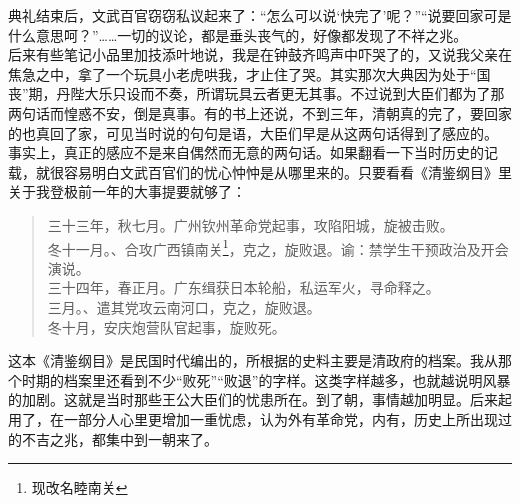 典礼结束后，文武百官窃窃私议起来了：“怎么可以说‘快完了’呢？”“说要回家可是什么意思呵？”……一切的议论，都是垂头丧气的，好像都发现了不祥之兆。\\

后来有些笔记小品里加技添叶地说，我是在钟鼓齐鸣声中吓哭了的，又说我父亲在焦急之中，拿了一个玩具小老虎哄我，才止住了哭。其实那次大典因为处于“国丧”期，丹陛大乐只设而不奏，所谓玩具云者更无其事。不过说到大臣们都为了那两句话而惶惑不安，倒是真事。有的书上还说，不到三年，清朝真的完了，要回家的也真回了家，可见当时说的句句是语，大臣们早是从这两句话得到了感应的。\\

事实上，真正的感应不是来自偶然而无意的两句话。如果翻看一下当时历史的记载，就很容易明白文武百官们的忧心忡忡是从哪里来的。只要看看《清鉴纲目》里关于我登极前一年的大事提要就够了：\\

\begin{quote}
	三十三年，秋七月。广州钦州革命党起事，攻陷阳城，旋被击败。\\

冬十一月。、合攻广西镇南关\footnote{现改名睦南关}，克之，旋败退。谕：禁学生干预政治及开会演说。\\

三十四年，春正月。广东缉获日本轮船，私运军火，寻命释之。\\

三月。、遣其党攻云南河口，克之，旋败退。\\

冬十月，安庆炮营队官起事，旋败死。\\
\end{quote}

这本《清鉴纲目》是民国时代编出的，所根据的史料主要是清政府的档案。我从那个时期的档案里还看到不少“败死”“败退”的字样。这类字样越多，也就越说明风暴的加剧。这就是当时那些王公大臣们的忧患所在。到了朝，事情越加明显。后来起用了，在一部分人心里更增加一重忧虑，认为外有革命党，内有，历史上所出现过的不吉之兆，都集中到一朝来了。\\

